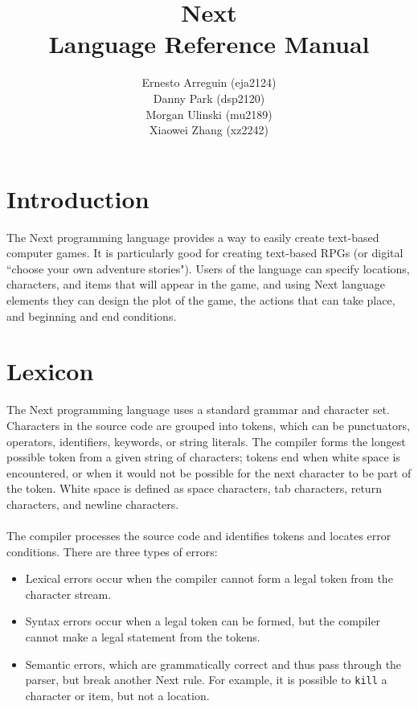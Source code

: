 \documentclass[12pt]{article}
\begin{document}
\title{\textbf{Next} \\ Language Reference Manual}
\author{Ernesto Arreguin (eja2124) \\Danny Park (dsp2120) \\Morgan Ulinski (mu2189) \\Xiaowei Zhang (xz2242)}
\date{}
\maketitle

\pagebreak

\tableofcontents

\section{Introduction}
The Next programming language provides a way to easily create text-based computer games.  It is particularly good for creating text-based RPGs (or digital ``choose your own adventure stories").  Users of the language can specify locations, characters, and items that will appear in the game, and using Next language elements they can design the plot of the game, the actions that can take place, and beginning and end conditions.

\section{Lexicon}
The Next programming language uses a standard grammar and character set.  Characters in the source code are grouped into tokens, which can be punctuators, operators, identifiers, keywords, or string literals.  The compiler forms the longest possible token from a given string of characters; tokens end when white space is encountered, or when it would not be possible for the next character to be part of the token.  White space is defined as space characters, tab characters, return characters, and newline characters.
\\
\\
\noindent The compiler processes the source code and identifies tokens and locates error conditions.  There are three types of errors:
\begin{itemize}
\item Lexical errors occur when the compiler cannot form a legal token from the character stream.
\item Syntax errors occur when a legal token can be formed, but the compiler cannot make a legal statement from the tokens.
\item Semantic errors, which are grammatically correct and thus pass through the parser, but break another Next rule.  For example, it is possible to \texttt{kill} a character or item, but not a location.
\end{itemize}
\end{document}
